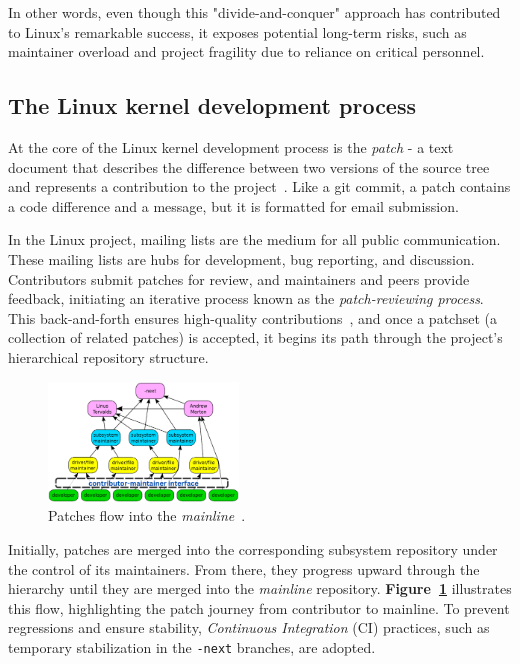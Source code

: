 \documentclass[sigconf]{acmart} %
\begin{document}
In other words, even though this "divide-and-conquer" approach has contributed
to Linux's remarkable success, it exposes potential long-term risks, such as
maintainer overload and project fragility due to reliance on critical personnel.

\subsection{The Linux kernel development process}

At the core of the Linux kernel development process is the \textit{patch} - a
text document that describes the difference between two versions of the source
tree and represents a contribution to the project~\cite{wen2021-masterthesis}.
Like a git commit, a patch contains a code difference and a message, but it is
formatted for email submission.

In the Linux project, mailing lists are the medium for all public communication.
These mailing lists are hubs for development, bug reporting, and discussion.
Contributors submit patches for review, and maintainers and peers provide
feedback, initiating an iterative process known as the \textit{patch-reviewing
process}. This back-and-forth ensures high-quality
contributions~\cite{palix2011-faults-linux}, and once a patchset (a collection
of related patches) is accepted, it begins its path through the project's
hierarchical repository structure.

\begin{figure}[ht]
    \centering
    \includegraphics[width=0.45\textwidth]{images/patch-lifecycle.png}
    \caption{Patches flow into the \textit{mainline}~\cite{gregkh2016-patches-carved}.\label{fig:patch-lifecycle}}
\end{figure}

Initially, patches are merged into the corresponding subsystem repository under
the control of its maintainers. From there, they progress upward through the
hierarchy until they are merged into the \textit{mainline} repository.
\textbf{Figure~\ref{fig:patch-lifecycle}} illustrates this flow, highlighting
the patch journey from contributor to mainline. To prevent regressions and
ensure stability, \textit{Continuous Integration} (CI) practices, such as
temporary stabilization in the \texttt{-next} branches, are adopted.
\end{document}
